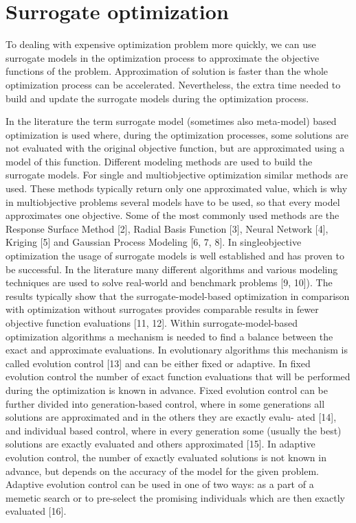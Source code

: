     \section{Surrogate optimization}

        To dealing with expensive optimization problem more quickly, we can use surrogate models in the optimization process to approximate the objective functions of the problem. Approximation of solution is faster than the whole optimization process can be accelerated. Nevertheless, the extra time needed to build and update the surrogate models during the optimization process.

        In the literature the term surrogate model (sometimes also meta-model) based optimization is 
        used where, during the optimization processes, some solutions are not evaluated with the original 
        objective function, but are approximated using a model of this function. Different modeling methods 
        are used to build the surrogate models. For single and multiobjective optimization similar methods are used. 
        These methods typically return only one approximated value, which is why in multiobjective problems several 
        models have to be used, so that every model approximates one objective. Some of the most commonly used methods 
        are the Response Surface Method [2], Radial Basis Function [3], Neural Network [4], Kriging [5] and 
        Gaussian Process Modeling [6, 7, 8]. 
        In singleobjective optimization the usage of surrogate models is well established and has proven to be successful. 
        In the literature many different algorithms and various modeling techniques are used to solve real-world and 
        benchmark problems [9, 10]). The results typically show that the surrogate-model-based optimization in 
        comparison with optimization without surrogates provides comparable results in fewer objective function 
        evaluations [11, 12].
        Within surrogate-model-based optimization algorithms a mechanism is needed to find a balance between the 
        exact and approximate evaluations. In evolutionary algorithms this mechanism is called evolution control [13] 
        and can be either fixed or adaptive. In fixed evolution control the number of exact function evaluations that 
        will be performed during the optimization is known in advance. Fixed evolution control can be further divided 
        into generation-based control, where in some generations all solutions are approximated and in the others they 
        are exactly evalu- ated [14], and individual based control, where in every generation some (usually the best) 
        solutions are exactly evaluated and others approximated [15].
        In adaptive evolution control, the number of exactly evaluated solutions is not known in advance,
        but depends on the accuracy of the model for the given problem. Adaptive evolution control can be used in one of two ways: 
        as a part of a memetic search or to pre-select the promising individuals which are then exactly evaluated [16].
        \cite{MlakarPTF15}

